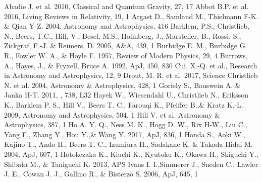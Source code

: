 \documentclass[a4paper,fleqn,usenatbib]{mnras}
\begin{document}
	
	\begin{thebibliography}{99}
		Abadie J. et al. 2010, Classical and Quantum Gravity, 27, 17
		Abbot B.P. et al. 2016, Living Reviews in Relativity, 19, 1
		Argast D., Samland M., Thielmann F-K. \& Qian Y-Z. 2004, Astronomy and Astrophysics, 416
		Barklem, P.S., Christlieb, N., Beers, T.C., Hill, V., Besel, M.S., Holmberg, J., Marsteller, B., Rossi, S., Zickgraf, F.-J. \& Reimers, D. 2005, A\&A, 439, 1
		Burbidge E. M., Burbidge G. R., Fowler W. A., \& Hoyle F. 1957, Review of Modern Physics, 29, 4
		Burrows, A., Hayes, J., \& Fryxell, Bruce A. 1992, ApJ, 450, 830
		Cui, X.-Q. et al., Research in Astronomy and Astrophysics, 12, 9
		Drout, M. R. et al. 2017, Science
		Christlieb N. et al. 2004, Astronomy \& Astrophysics, 428, 1
		Goriely S., Bauswein A. \& Janka H-T. 2011, , 738, L32
		Hayek W., Wiesendahl U., Christlieb N., Eriksson K., Barklem P. S., Hill V., Beers T. C., Farouqi K., Pfeiffer B.,\& Kratz K.-L. 2009, Astronomy and Astrophysics, 504, 1
		Hill V. et al. Astronomy \& Astrophysics, 387, 1
		Ho A. Y. Q., Ness M. K., Hogg D. W., Rix H-W., Liu C., Yang F., Zhang Y., Hou Y.,\& Wang Y. 2017, ApJ, 836, 1
		Honda S., Aoki W., Kajino T., Ando H., Beers T. C., Izumiura H., Sadakane K. \& Takada-Hidai M. 2004, ApJ, 607, 1
		Hotokezaka K., Kiuchi K., Kyutoku K., Okawa H., Skiguchi Y., Shibata M., \& Taniguchi K. 2013, APS
		Ivans I. I.,Simmerer J., Sneden C., Lawler J. E., Cowan J. J., Gallino R., \& Bisterzo S. 2006, ApJ, 645, 1

\end{thebibliography}
\end{document}
